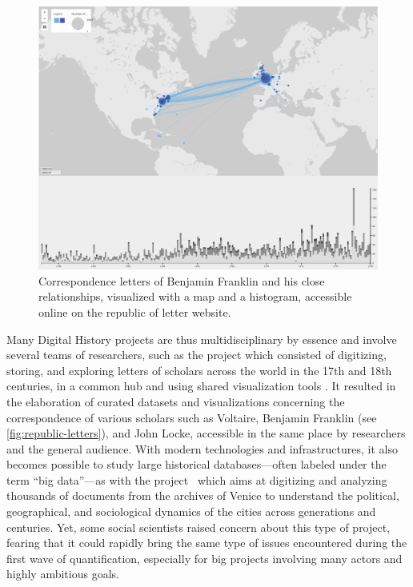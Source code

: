 \begin{figure}[!ht]
    \centering %
    \includegraphics[width=1\textwidth]{static/figures/RelatedWork/RepublicOfLetter_BenjFranklin}
    \caption{Correspondence letters of Benjamin Franklin and his close relationships, visualized with a map and a histogram, accessible online on the republic of letter website\cite{edelsteinHistoricalResearchDigital2017}.}
    \label{fig:republic-letters}
\end{figure}
Many Digital History projects are thus multidisciplinary by essence and involve several teams of researchers, such as the  project which consisted of digitizing, storing, and exploring letters of scholars across the world in the 17th and 18th centuries, in a common hub and using shared visualization tools \cite{edelsteinHistoricalResearchDigital2017}.
It resulted in the elaboration of curated datasets and visualizations concerning the correspondence of various scholars such as Voltaire, Benjamin Franklin (see \autoref{fig:republic-letters}), and John Locke, accessible in the same place by researchers and the general audience.
With modern technologies and infrastructures, it also becomes possible to study large historical databases---often labeled under the term ``big data''---as with the  project~\cite{kaplanVeniceTimeMachine2015} which aims at digitizing and analyzing thousands of documents from the archives of Venice to understand the political, geographical, and sociological dynamics of the cities across generations and centuries.
Yet, some social scientists raised concern about this type of project, fearing that it could rapidly bring the same type of issues encountered during the first wave of quantification, especially for big projects involving many actors and highly ambitious goals\cite{ollion2015dela, lemercierQuantitativeMethodsHumanities2019}.

